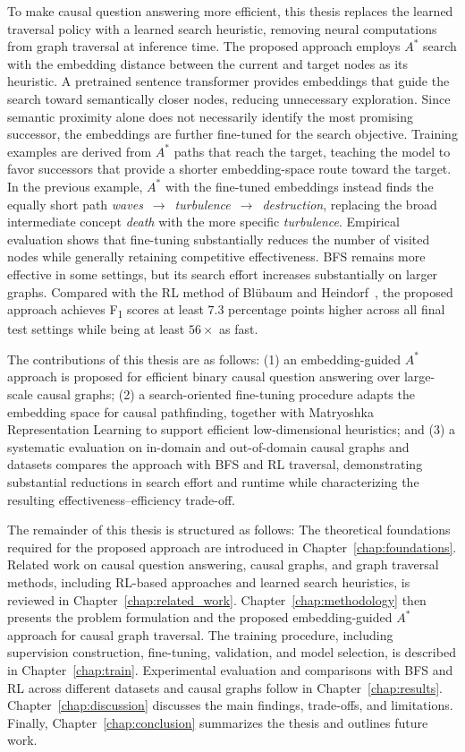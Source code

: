 To make causal question answering more efficient, this thesis replaces the learned traversal policy with a learned search heuristic, removing neural computations from graph traversal at inference time. The proposed approach employs $A^*$ search with the embedding distance between the current and target nodes as its heuristic. A pretrained sentence transformer provides embeddings that guide the search toward semantically closer nodes, reducing unnecessary exploration. Since semantic proximity alone does not necessarily identify the most promising successor, the embeddings are further fine-tuned for the search objective. Training examples are derived from $A^*$ paths that reach the target, teaching the model to favor successors that provide a shorter embedding-space route toward the target. In the previous example, $A^*$ with the fine-tuned embeddings instead finds the equally short path \mbox{\textit{waves} $\rightarrow$ \textit{turbulence} $\rightarrow$ \textit{destruction}}, replacing the broad intermediate concept \textit{death} with the more specific \textit{turbulence}. Empirical evaluation shows that fine-tuning substantially reduces the number of visited nodes while generally retaining competitive effectiveness. BFS remains more effective in some settings, but its search effort increases substantially on larger graphs. Compared with the RL method of Blübaum and Heindorf~\cite{bluebaum:2024}, the proposed approach achieves F\textsubscript{1} scores at least \(7.3\) percentage points higher across all final test settings while being at least \(56\times\) as fast.

The contributions of this thesis are as follows: (1) an embedding-guided \(A^*\) approach is proposed for efficient binary causal question answering over large-scale causal graphs; (2) a search-oriented fine-tuning procedure adapts the embedding space for causal pathfinding, together with Matryoshka Representation Learning to support efficient low-dimensional heuristics; and (3) a systematic evaluation on in-domain and out-of-domain causal graphs and datasets compares the approach with BFS and RL traversal, demonstrating substantial reductions in search effort and runtime while characterizing the resulting effectiveness--efficiency trade-off.

The remainder of this thesis is structured as follows:
The theoretical foundations required for the proposed approach are introduced in Chapter~\ref{chap:foundations}. Related work on causal question answering, causal graphs, and graph traversal methods, including RL-based approaches and learned search heuristics, is reviewed in Chapter~\ref{chap:related_work}. Chapter~\ref{chap:methodology} then presents the problem formulation and the proposed embedding-guided \(A^*\) approach for causal graph traversal. The training procedure, including supervision construction, fine-tuning, validation, and model selection, is described in Chapter~\ref{chap:train}. Experimental evaluation and comparisons with BFS and RL across different datasets and causal graphs follow in Chapter~\ref{chap:results}. Chapter~\ref{chap:discussion} discusses the main findings, trade-offs, and limitations. Finally, Chapter~\ref{chap:conclusion} summarizes the thesis and outlines future work.
